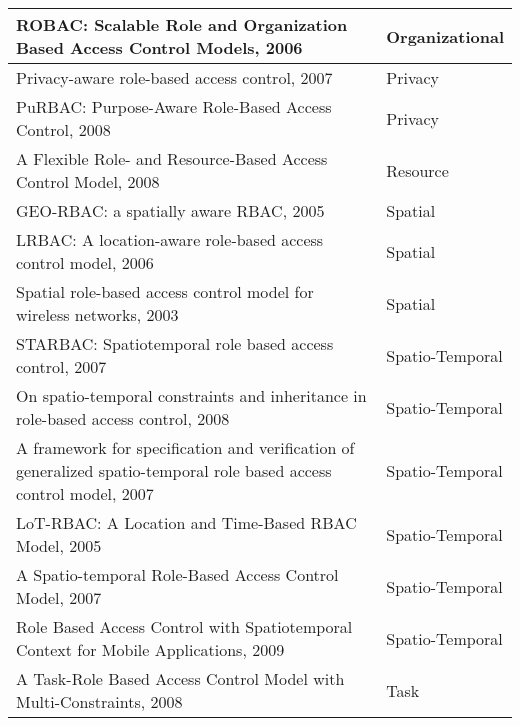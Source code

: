 \begin{table}
\begin{tabular}{|p{12.5cm}|p{3cm}|}
ROBAC: Scalable Role and Organization Based Access Control Models, 2006 \cite{zhang06:collaborative} & Organizational \\\hline

Privacy-aware role-based access control, 2007 \cite{ni2010privacy} & Privacy \\\hline

PuRBAC: Purpose-Aware Role-Based Access Control, 2008 \cite{masoumzadeh2008purbac} & Privacy \\\hline

A Flexible Role- and Resource-Based Access Control Model, 2008 \cite{zhao2008flexible} & Resource \\\hline

GEO-RBAC: a spatially aware RBAC, 2005 \cite{damian2007geo} & Spatial \\\hline

LRBAC: A location-aware role-based access control model, 2006 \cite{ray07:spatio} & Spatial \\\hline

Spatial role-based access control model for wireless networks, 2003 \cite{hansen2003spatial} & Spatial \\\hline

STARBAC: Spatiotemporal role based access control, 2007 \cite{aich07:STARBAC} & Spatio-Temporal \\\hline

On spatio-temporal constraints and inheritance in role-based access control, 2008 \cite{chen08:spatio-temporal} & Spatio-Temporal \\\hline

A framework for specification and verification of generalized spatio-temporal role based access control model, 2007 \cite{samuel07:spatio-temporal} & Spatio-Temporal \\\hline

LoT-RBAC: A Location and Time-Based RBAC Model, 2005 \cite{chandran05:llt} & Spatio-Temporal \\\hline

A Spatio-temporal Role-Based Access Control Model, 2007 \cite{ray07:spatio} & Spatio-Temporal \\\hline

Role Based Access Control with Spatiotemporal Context for Mobile Applications, 2009 \cite{aich09:role} & Spatio-Temporal \\\hline

A Task-Role Based Access Control Model with Multi-Constraints, 2008 \cite{yao2008task} & Task \\\hline


\end{tabular}
\end{table}
